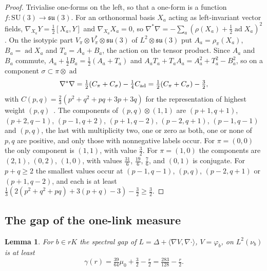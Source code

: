 \documentclass[aps,prd,twocolumn,superscriptaddress,nofootinbib,longbibliography,floatfix,amsmath,amssymb,10pt]{revtex4-2}
\newtheorem{lemma}[theorem]{Lemma}
\theoremstyle{definition}
\theoremstyle{remark}
\newcommand{\SU}{\mathrm{SU}}
\newcommand{\ip}[2]{\langle #1,#2\rangle}
\begin{document}
\begin{proof}
Trivialise one-forms on the left, so that a one-form is a function
$f:\SU(3)\to\mathfrak{su}(3)$. For an orthonormal basis $X_a$ acting as
left-invariant vector fields, $\nabla_{X_a}Y=\frac12[X_a,Y]$ and
$\nabla_{X_a}X_a=0$, so $\nabla^*\nabla=-\sum_a(\rho(X_a)+\frac12\operatorname{ad}
X_a)^2$. On the isotypic part $V_\pi\otimes V_\pi^*\otimes\mathfrak{su}(3)$ of
$L^2\otimes\mathfrak{su}(3)$ put $A_a=\rho_\pi(X_a)$, $B_a=\operatorname{ad}X_a$
and $T_a=A_a+B_a$, the action on the tensor product. Since $A_a$ and $B_a$
commute, $A_a+\frac12B_a=\frac12(A_a+T_a)$ and $A_aT_a+T_aA_a=A_a^2+T_a^2-B_a^2$,
so on a component $\sigma\subset\pi\otimes\operatorname{ad}$
\[
\nabla^*\nabla=\tfrac12(C_\pi+C_\sigma)-\tfrac14C_{\rm ad}=\tfrac12(C_\pi+
C_\sigma)-\tfrac32 ,
\]
with $C(p,q)=\frac23(p^2+q^2+pq+3p+3q)$ for the representation of highest
weight $(p,q)$~\cite{FH91}. The components of $(p,q)\otimes(1,1)$
are $(p+1,q+1)$, $(p+2,q-1)$, $(p-1,q+2)$, $(p+1,q-2)$, $(p-2,q+1)$,
$(p-1,q-1)$ and $(p,q)$, the last with multiplicity two, one or zero as both,
one or none of $p,q$ are positive, and only those with nonnegative labels
occur. For $\pi=(0,0)$ the only component is $(1,1)$, with value
$\frac32$. For $\pi=(1,0)$ the components are $(2,1)$, $(0,2)$, $(1,0)$, with
values $\frac{31}6$, $\frac{19}6$, $\frac76$, and $(0,1)$ is conjugate. For
$p+q\ge2$ the smallest values occur at $(p-1,q-1)$, $(p,q)$, $(p-2,q+1)$ or
$(p+1,q-2)$, and each is at least $\frac13(2(p^2+q^2+pq)+3(p+q)-3)-\frac32\ge
\frac32$.
\end{proof}

\subsection{The gap of the one-link measure}

\begin{lemma}\label{lem:gap}
For $b\in rK$ the spectral gap of $L=\Delta+\ip{\nabla V}{\nabla\cdot}$,
$V=\varphi_b$, on $L^2(\nu_b)$ is at least
\[
\gamma(r)=\tfrac{39}{64}\mu_0+\tfrac32-\tfrac r2=\tfrac{283}{128}-\tfrac r2 .
\]
\end{lemma}
\end{document}
